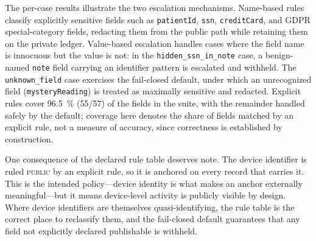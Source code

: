 \documentclass[final,5p,times,twocolumn]{elsarticle}
\begin{document}
The per-case results illustrate the two escalation mechanisms. Name-based rules
classify explicitly sensitive fields such as \texttt{patientId}, \texttt{ssn},
\texttt{creditCard}, and GDPR special-category fields, redacting them from the
public path while retaining them on the private ledger. Value-based escalation
handles cases where the field name is innocuous but the value is not: in the
\texttt{hidden\_ssn\_in\_note} case, a benign-named \texttt{note} field carrying
an identifier pattern is escalated and withheld. The \texttt{unknown\_field}
case exercises the fail-closed default, under which an unrecognized field
(\texttt{mysteryReading}) is treated as maximally sensitive and redacted.
Explicit rules cover \SI{96.5}{\percent} (55/57) of the fields in the suite,
with the remainder handled safely by the default; coverage here denotes the
share of fields matched by an explicit rule, not a measure of accuracy, since
correctness is established by construction.

One consequence of the declared rule table deserves note. The device identifier
is ruled \textsc{public} by an explicit rule, so it is anchored on every record
that carries it. This is the intended policy---device identity is what makes an
anchor externally meaningful---but it means device-level activity is publicly
visible by design. Where device identifiers are themselves quasi-identifying,
the rule table is the correct place to reclassify them, and the fail-closed
default guarantees that any field not explicitly declared publishable is
withheld.
\end{document}
